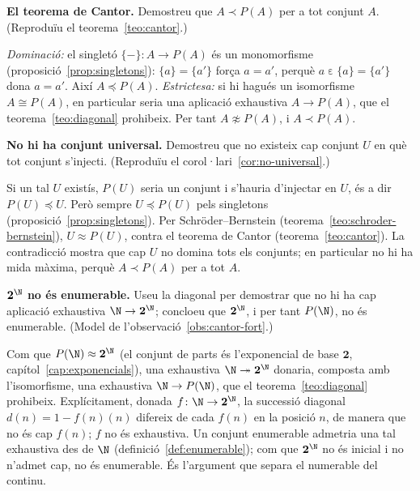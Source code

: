 \begin{exercici}
\textbf{El teorema de Cantor.} Demostreu que \(A\prec P(A)\) per a tot conjunt \(A\). (Reproduïu el teorema~\ref{teo:cantor}.)
\end{exercici}
\begin{solucio}
\emph{Dominació:} el singletó \(\{-\}\colon A\to P(A)\) és un monomorfisme (proposició~\ref{prop:singletons}): \(\{a\}=\{a'\}\) força \(a=a'\), perquè \(a\mathrel{\varepsilon}\{a\}=\{a'\}\) dona \(a=a'\). Així \(A\preceq P(A)\). \emph{Estrictesa:} si hi hagués un isomorfisme \(A\cong P(A)\), en particular seria una aplicació exhaustiva \(A\to P(A)\), que el teorema~\ref{teo:diagonal} prohibeix. Per tant \(A\not\approx P(A)\), i \(A\prec P(A)\).
\end{solucio}

\begin{exercici}
\textbf{No hi ha conjunt universal.} Demostreu que no existeix cap conjunt \(U\) en què tot conjunt s'injecti. (Reproduïu el corol·lari~\ref{cor:no-universal}.)
\end{exercici}
\begin{solucio}
Si un tal \(U\) existís, \(P(U)\) seria un conjunt i s'hauria d'injectar en \(U\), és a dir \(P(U)\preceq U\). Però sempre \(U\preceq P(U)\) pels singletons (proposició~\ref{prop:singletons}). Per Schröder--Bernstein (teorema~\ref{teo:schroder-bernstein}), \(U\approx P(U)\), contra el teorema de Cantor (teorema~\ref{teo:cantor}). La contradicció mostra que cap \(U\) no domina tots els conjunts; en particular no hi ha mida màxima, perquè \(A\prec P(A)\) per a tot \(A\).
\end{solucio}

\begin{exercici}
\textbf{\(\mathbf2^{\N}\) no és enumerable.} Useu la diagonal per demostrar que no hi ha cap aplicació exhaustiva \(\N\to\mathbf2^{\N}\); concloeu que \(\mathbf2^{\N}\), i per tant \(P(\N)\), no és enumerable. (Model de l'observació~\ref{obs:cantor-fort}.)
\end{exercici}
\begin{solucio}
Com que \(P(\N)\approx\mathbf2^{\N}\) (el conjunt de parts és l'exponencial de base \(\mathbf2\), capítol~\ref{cap:exponencials}), una exhaustiva \(\N\twoheadrightarrow\mathbf2^{\N}\) donaria, composta amb l'isomorfisme, una exhaustiva \(\N\to P(\N)\), que el teorema~\ref{teo:diagonal} prohibeix. Explícitament, donada \(f\colon\N\to\mathbf2^{\N}\), la successió diagonal \(d(n)=1-f(n)(n)\) difereix de cada \(f(n)\) en la posició \(n\), de manera que no és cap \(f(n)\); \(f\) no és exhaustiva. Un conjunt enumerable admetria una tal exhaustiva des de \(\N\) (definició~\ref{def:enumerable}); com que \(\mathbf2^{\N}\) no és inicial i no n'admet cap, no és enumerable. És l'argument que separa el numerable del continu.
\end{solucio}
